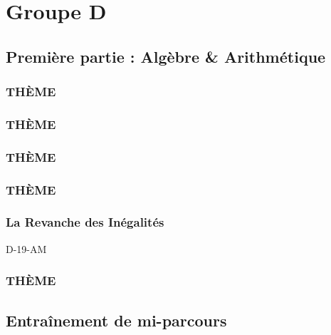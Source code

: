 \documentclass[poly,trombi]{valbonne}
\begin{document}






\chapter{Groupe D}

\minitoc \clearpage

\section{Première partie : Algèbre \& Arithmétique}

\subsection{THÈME}


\subsection{THÈME}


\subsection{THÈME}


\subsection{THÈME}


\subsection{La Revanche des Inégalités}

{D-19-AM}

\subsection{THÈME}


\section{Entraînement de mi-parcours}
\end{document}
